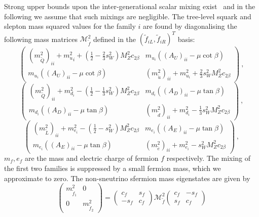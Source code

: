 \documentclass[]{article}
\def\half{\frac{1}{2}}
\begin{document}
Strong upper bounds upon the inter-generational scalar mixing
exist~\cite{Gabbiani:1996hi} and in the following we assume that such mixings
are negligible.
The tree-level squark and slepton mass squared values for the family $i$
are found by diagonalising the following mass
matrices ${\mathcal M}_{\tilde f}^2$ defined in the $({\tilde f}_{iL}, {\tilde
f}_{iR})^T$ basis: 
%
\begin{equation}
\label{sqmu} \left(\begin{array}{cc}
(m_{\tilde Q}^2)_{ii} + {m_u^2}_i + (\half - \frac{2}{3} s_W^2)M_Z^2c_{2\beta} &
m_{u_i}\left((A_U)_{ii}-\mu\cot\beta\right)\\
m_{u_i}\left((A_U)_{ii}-\mu\cot\beta\right) & (m^2_{\tilde u})_{ii} +
m_{u_i}^2 +
\frac{2}{3} s_W^2 M_Z^2c_{2\beta}
\end{array}\right)\ ,
\end{equation}
%
\begin{equation}
\label{sqmd}  \left(\begin{array}{cc}
(m_{\tilde Q}^2)_{ii} + m_{d_i}^2 - (\half - \frac{1}{3} s_W^2)M_Z^2c_{2\beta} &
m_{d_i}\left((A_D)_{ii}-\mu\tan\beta\right)\\
m_{d_i}\left((A_D)_{ii}-\mu\tan\beta\right) & (m^2_{\tilde d})_{ii} +
m_{d_i}^2 -\frac{1}{3} s_W^2 M_Z^2c_{2\beta}
\end{array}\right)~,
\end{equation}
%
\begin{equation}
\label{sqme}  \left(\begin{array}{cc}
(m_{\tilde L}^2)_{ii} + m_{e_i}^2 - (\half - s_W^2) M_Z^2 c_{2\beta} &
m_{e_i}\left((A_E)_{ii}-\mu\tan\beta\right)\\
m_{e_i}\left((A_E)_{ii}-\mu\tan\beta\right) & (m^2_{\tilde e})_{ii} +
m_{e_i}^2 - s_W^2 M_Z^2c_{2\beta}
\end{array}\right)~,
\end{equation}
%
$m_f, e_f$ are the mass and electric charge of fermion $f$ respectively.
The mixing of the first two families is suppressed by a small fermion mass,
which we approximate to zero.
The non-sneutrino sfermion mass eigenstates are given by
%
\begin{equation}
\left(\begin{array}{cc} m_{\tilde f_1}^2 & 0 \\ 0 & m_{\tilde f_2}^2 
\end{array} \right) =
\left(\begin{array}{cc} c_f & s_f\\-s_f & c_f \end{array}\right)
{\mathcal M}_{\tilde f} ^2
\left(\begin{array}{cc} c_f & -s_f\\s_f & c_f \end{array}\right)
\end{equation}
\end{document}
